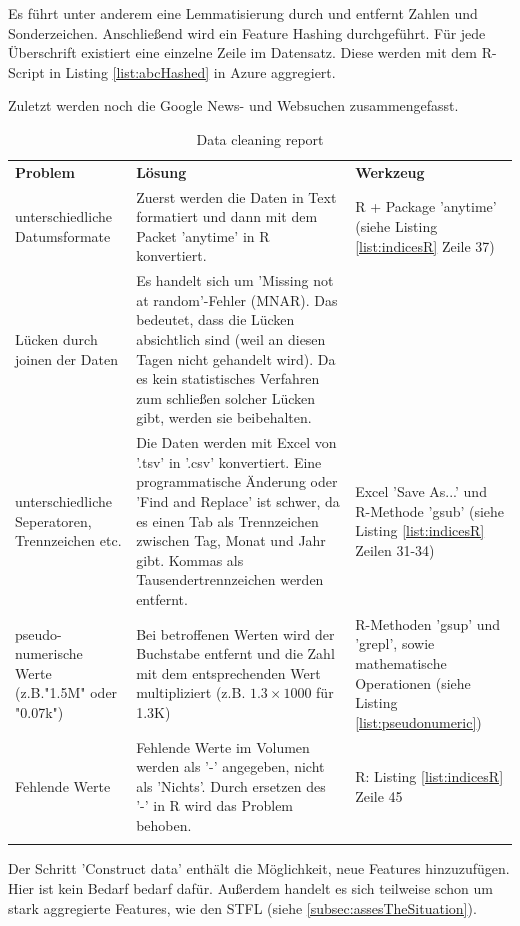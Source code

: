 
Es führt unter anderem eine Lemmatisierung durch und entfernt Zahlen und Sonderzeichen. Anschließend wird ein Feature Hashing durchgeführt. Für jede Überschrift existiert eine einzelne Zeile im Datensatz. Diese werden mit dem R-Script in Listing \ref{list:abcHashed} in Azure aggregiert.

Zuletzt werden noch die Google News- und Websuchen zusammengefasst.
\begin{longtable}[H]{|p{4cm}|p{8cm}|p{4cm}|}
\hline
\textbf{Problem} & \textbf{Lösung} & \textbf{Werkzeug} \\
\hhline{===} 
unterschiedliche Datumsformate & Zuerst werden die Daten in Text formatiert und dann mit dem Packet 'anytime' in R konvertiert. & R + Package 'anytime' (siehe Listing \ref{list:indicesR} Zeile 37) \\ \hline
Lücken durch joinen der Daten & Es handelt sich um 'Missing not at random'-Fehler (MNAR)\citep[S.~553]{graham_missing_2009}. Das bedeutet, dass die Lücken absichtlich sind (weil an diesen Tagen nicht gehandelt wird). Da es kein statistisches Verfahren zum schließen solcher Lücken gibt, werden sie beibehalten. \citep[S.~1109]{leonhart_dorsch_2014} & \\ \hline
unterschiedliche Seperatoren, Trennzeichen etc. & Die Daten werden mit Excel von '.tsv' in '.csv' konvertiert. Eine programmatische Änderung oder 'Find and Replace' ist schwer, da es einen Tab als Trennzeichen zwischen Tag, Monat und Jahr gibt. Kommas als Tausendertrennzeichen werden entfernt. & Excel 'Save As...' und R-Methode 'gsub' (siehe Listing \ref{list:indicesR} Zeilen 31-34) \\ \hline
pseudo-numerische Werte (z.B."1.5M" oder "0.07k") & Bei betroffenen Werten wird der Buchstabe entfernt und die Zahl mit dem entsprechenden Wert multipliziert (z.B. $ 1.3 \times 1000 $ für 1.3K) & R-Methoden 'gsup' und 'grepl', sowie mathematische Operationen (siehe Listing \ref{list:pseudonumeric})\\ \hline
Fehlende Werte & Fehlende Werte im Volumen werden als '-' angegeben, nicht als 'Nichts'. Durch ersetzen des '-' in R wird das Problem behoben. & R: Listing \ref{list:indicesR} Zeile 45 \\ \hline
\caption{Data cleaning report}
\label{tab:selecData}
\end{longtable}

Der Schritt 'Construct data' enthält die Möglichkeit, neue Features hinzuzufügen. Hier ist kein Bedarf bedarf dafür. Außerdem handelt es sich teilweise schon um stark aggregierte Features, wie den STFL (siehe \ref{subsec:assesTheSituation}).

